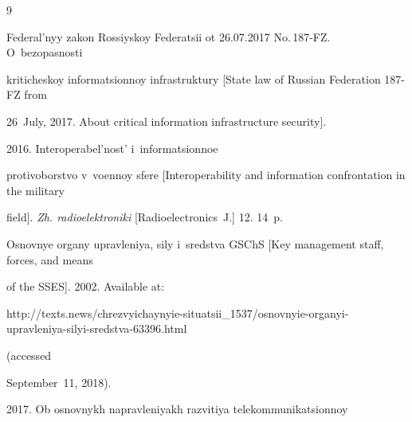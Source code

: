 






 





\renewcommand{\bibname}{\protect\rmfamily References}




{\small\frenchspacing

{%


\begin{thebibliography}{9}




Federal'nyy zakon Rossiyskoy Federatsii ot 26.07.2017 No.\,187-FZ. O~bezopasnosti 

kriticheskoy informatsionnoy infrastruktury [State law of Russian Federation 187-FZ from 

26~July, 2017. About critical information infrastructure security]. 


 2016. Interoperabel'nost' i~informatsionnoe 

protivoborstvo v~voennoy sfere [Interoperability and information confrontation in the military 

field]. \textit{Zh. radioelektroniki} [Radioelectronics~J.] 12. 14~p.


Osnovnye organy upravleniya, sily i~sredstva GSChS [Key management staff, forces, and means 

of the SSES]. 2002. Available at: {\sf  

http://texts.news/chrezvyichaynyie-\linebreak situatsii\_1537/osnovnyie-organyi-upravleniya-silyi-sredstva-63396.html} (accessed  

Sep\-tem\-ber~11, 2018).


 2017. Ob osnovnykh napravleniyakh razvitiya telekommunikatsionnoy 


\end{thebibliography}}}
